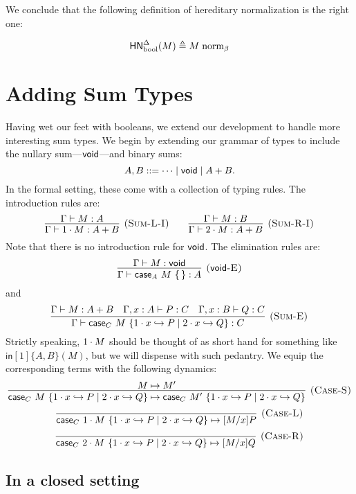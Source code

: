 \documentclass{article}
\begin{document}
We conclude that the following definition of hereditary normalization is the right one:

\[
\mathsf{HN}^{\Delta}_{\text{bool}}(M) \triangleq M \mathrel{\text{norm}_\beta}
\]

\section{Adding Sum Types}

Having wet our feet with booleans, we extend our development to handle more interesting sum types.
We begin by extending our grammar of types to include the nullary sum---$\mathsf{void}$---and binary sums:
\[
  A, B ::= \dotsb \mid \mathsf{void} \mid A + B.
\]
In the formal setting, these come with a collection of typing rules.
The introduction rules are:
\[
  \infer[\rn{Sum-L-I}]{
    \hasEF{\Gamma}{\inl M}{A + B}
  }{
    \hasEF{\Gamma}{M}{A}
  }
  \qquad
  \infer[\rn{Sum-R-I}]{
    \hasEF{\Gamma}{\inr M}{A + B}
  }{
    \hasEF{\Gamma}{M}{B}
  }
\]
Note that there is no introduction rule for $\mathsf{void}$.
The elimination rules are:
\[
  \infer[\rn{\void-E}]{
    \hasEF{\Gamma}{\vcase{A}{M}}{A}
  }{
    \hasEF{\Gamma}{M}{\void}
  }
\]
and
\[
  \infer[\rn{Sum-E}]{
    \hasEF{\Gamma}{\scase{C}{M}{x}{P}{Q}}{C}
  }{
    \hasEF{\Gamma}{M}{A+B}
    &
    \hasEF{\Gamma,x:A}{P}{C}
    &
    \hasEF{\Gamma,x:B}{Q}{C}
  }
\]
Strictly speaking, $1\cdot M$ should be thought of as short hand for something like $\mathsf{in}[1]\{A,B\}(M)$, but we will dispense with such pedantry.
We equip the corresponding terms with the following dynamics:
\[
  \infer[\rn{Case-S}]{
    \step{\scase{C}{M}{x}{P}{Q}}{\scase{C}{M'}{x}{P}{Q}}
  }{
    \step{M}{M'}
  }
\]
\[
  \infer[\rn{Case-L}]{
    \step{\scase{C}{\inl M}{x}{P}{Q}}{\subst{M}{x}{P}}
  }{}
\]
\[
  \infer[\rn{Case-R}]{
    \step{\scase{C}{\inr M}{x}{P}{Q}}{\subst{M}{x}{Q}}
  }{}
\]

\subsection{In a closed setting}
\end{document}
